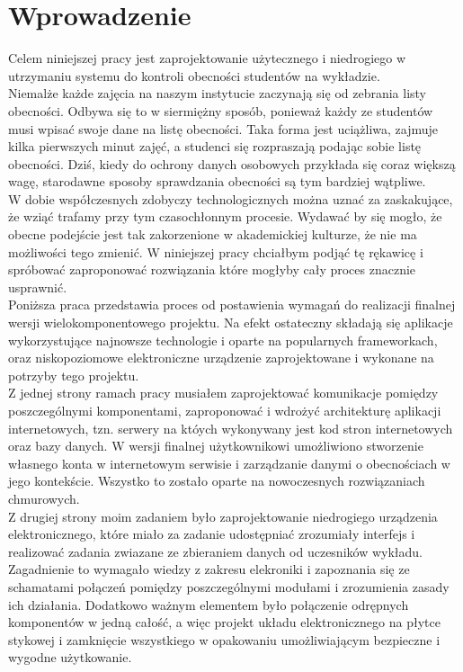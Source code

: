 \documentclass[declaration,shortabstract, mgr]{iithesis}
\author {Dawid Szczyrk}
\begin{document}
\chapter{Wprowadzenie}

Celem niniejszej pracy jest zaprojektowanie użytecznego i niedrogiego w utrzymaniu systemu do kontroli obecności studentów na wykładzie.\\
\indent Niemalże każde zajęcia na naszym instytucie zaczynają się od zebrania listy obecności. Odbywa się to w siermiężny sposób, ponieważ każdy ze studentów musi wpisać swoje dane na listę obecności.
Taka forma jest uciążliwa, zajmuje kilka pierwszych minut zajęć, a studenci się rozpraszają podając sobie listę obecności. Dziś, kiedy do ochrony danych osobowych przykłada się
coraz większą wagę, starodawne sposoby sprawdzania obecności są tym bardziej wątpliwe.\\
\indent W dobie współczesnych zdobyczy technologicznych można uznać za zaskakujące, że wziąć trafamy przy tym czasochłonnym procesie. Wydawać by się mogło, że obecne podejście jest tak zakorzenione w akademickiej kulturze, że nie ma możliwości tego zmienić. W niniejszej pracy chciałbym podjąć tę rękawicę i spróbować zaproponować rozwiązania które mogłyby cały proces znacznie usprawnić. \\
\indent Poniższa praca przedstawia proces od postawienia wymagań do realizacji finalnej wersji wielokomponentowego projektu. Na efekt ostateczny składają się aplikacje wykorzystujące najnowsze technologie i oparte na popularnych frameworkach, oraz niskopoziomowe elektroniczne urządzenie zaprojektowane i wykonane na potrzyby tego projektu.\\
\indent Z jednej strony ramach pracy musiałem zaprojektować komunikacje pomiędzy poszczególnymi komponentami, zaproponować i wdrożyć architekturę aplikacji internetowych, tzn. serwery na któych wykonywany jest kod stron internetowych oraz bazy danych. W wersji finalnej użytkownikowi umożliwiono stworzenie własnego konta w internetowym serwisie i zarządzanie danymi o obecnościach w jego kontekście. Wszystko to zostało oparte na nowoczesnych rozwiązaniach chmurowych. \\
\indent Z drugiej strony moim zadaniem było zaprojektowanie niedrogiego urządzenia elektronicznego, które miało za zadanie udostępniać zrozumiały interfejs i realizować zadania zwiazane ze zbieraniem danych od uczesników wykładu. Zagadnienie to wymagało wiedzy z zakresu elekroniki i zapoznania się ze schamatami połączeń pomiędzy poszczególnymi modułami i zrozumienia zasady ich działania. Dodatkowo ważnym elementem było połączenie odrępnych komponentów w jedną całość, a więc projekt układu elektronicznego na płytce stykowej i zamknięcie wszystkiego w opakowaniu umożliwiającym bezpieczne i wygodne użytkowanie. 
\end{document}
